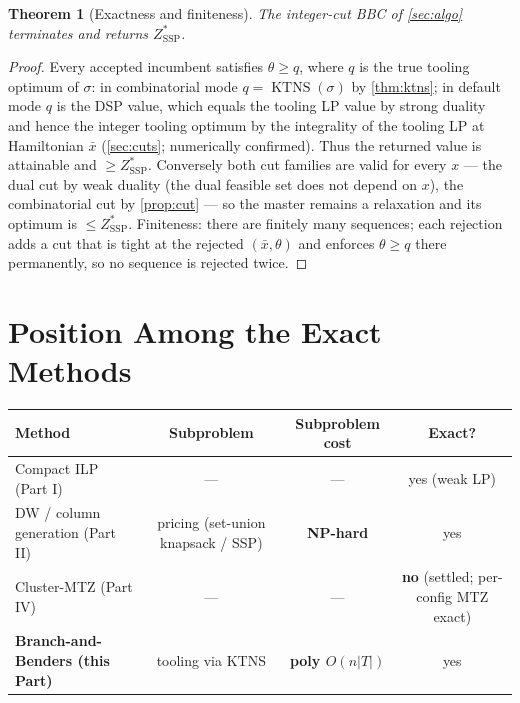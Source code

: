 \documentclass[11pt,a4paper]{article}
\theoremstyle{plain}
\newtheorem{theorem}{Theorem}[section]
\theoremstyle{definition}
\DeclareMathOperator{\KTNS}{KTNS}
\newcommand{\ZSSP}{Z_{\mathrm{SSP}}^{*}}
\begin{document}
\begin{thmbox}
\begin{theorem}[Exactness and finiteness]
\label{thm:exact}
The integer-cut BBC of \cref{sec:algo} terminates and returns $\ZSSP$.
\end{theorem}
\end{thmbox}
\begin{proofbox}
\begin{proof}
Every accepted incumbent satisfies $\theta\ge q$, where $q$ is the true tooling optimum of
$\sigma$: in combinatorial mode $q=\KTNS(\sigma)$ by \cref{thm:ktns}; in default mode $q$
is the DSP value, which equals the tooling LP value by strong duality and hence the
integer tooling optimum by the integrality of the tooling LP at Hamiltonian $\bar x$
(\cref{sec:cuts}; numerically confirmed). Thus the returned value is attainable and
$\ge\ZSSP$. Conversely both cut families are valid for every $x$ --- the dual cut by weak
duality (the dual feasible set does not depend on $x$), the combinatorial cut by
\cref{prop:cut} --- so the master remains a relaxation and its optimum is $\le\ZSSP$.
Finiteness: there are finitely many sequences; each rejection adds a cut that is tight at
the rejected $(\bar x,\theta)$ and enforces $\theta\ge q$ there permanently, so no
sequence is rejected twice.
\end{proof}
\end{proofbox}

\section{Position Among the Exact Methods}
\label{sec:position}

\begin{center}
\renewcommand{\arraystretch}{1.3}
\begin{tabular}{lccc}
\toprule
\textbf{Method} & \textbf{Subproblem} & \textbf{Subproblem cost} & \textbf{Exact?} \\
\midrule
Compact ILP (Part I) & --- & --- & yes (weak LP) \\
DW / column generation (Part II) & pricing (set-union knapsack / SSP) & \textbf{NP-hard} & yes \\
Cluster-MTZ (Part IV) & --- & --- & \textbf{no} (settled; per-config MTZ exact) \\
\textbf{Branch-and-Benders (this Part)} & tooling via KTNS & \textbf{poly $O(n|T|)$} & yes \\
\bottomrule
\end{tabular}
\end{center}
\end{document}
